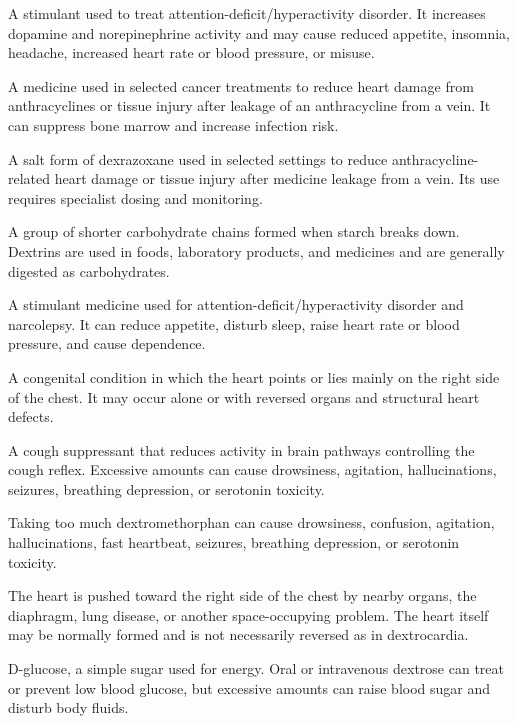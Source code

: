  A stimulant used to treat attention-deficit/hyperactivity disorder. It increases dopamine and norepinephrine activity and may cause reduced appetite, insomnia, headache, increased heart rate or blood pressure, or misuse.

 A medicine used in selected cancer treatments to reduce heart damage from anthracyclines or tissue injury after leakage of an anthracycline from a vein. It can suppress bone marrow and increase infection risk.

 A salt form of dexrazoxane used in selected settings to reduce anthracycline-related heart damage or tissue injury after medicine leakage from a vein. Its use requires specialist dosing and monitoring.

 A group of shorter carbohydrate chains formed when starch breaks down. Dextrins are used in foods, laboratory products, and medicines and are generally digested as carbohydrates.

 A stimulant medicine used for attention-deficit/hyperactivity disorder and narcolepsy. It can reduce appetite, disturb sleep, raise heart rate or blood pressure, and cause dependence.


 A congenital condition in which the heart points or lies mainly on the right side of the chest. It may occur alone or with reversed organs and structural heart defects.

 A cough suppressant that reduces activity in brain pathways controlling the cough reflex. Excessive amounts can cause drowsiness, agitation, hallucinations, seizures, breathing depression, or serotonin toxicity.

 Taking too much dextromethorphan can cause drowsiness, confusion, agitation, hallucinations, fast heartbeat, seizures, breathing depression, or serotonin toxicity.

 The heart is pushed toward the right side of the chest by nearby organs, the diaphragm, lung disease, or another space-occupying problem. The heart itself may be normally formed and is not necessarily reversed as in dextrocardia.

 D-glucose, a simple sugar used for energy. Oral or intravenous dextrose can treat or prevent low blood glucose, but excessive amounts can raise blood sugar and disturb body fluids.

